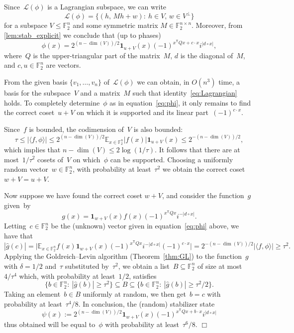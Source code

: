 \documentclass[11pt]{amsart}
\newcommand{\E}{\mathbb{E}}
\newcommand{\F}{\mathbb{F}} %
\newcommand{\Lcal}{\mathcal{L}}
\newcommand{\one}{\mathbf{1}}
\theoremstyle{plain}
\theoremstyle{definition}
\theoremstyle{remark}
\renewenvironment{proof}[1][]{
    	\begin{trivlist}
     	\item[\hspace{\labelsep}{\em\noindent Proof#1:\/}]}
     	{{\hfill$\Box$}
    	\end{trivlist}
  }
\begin{document}
\begin{proof}
Since~$\Lcal(\phi)$ is a Lagrangian subspace, we can write
\begin{equation} \label{eq:Lagrangian}
    \Lcal(\phi) = \big\{(h,\, Mh+w):\: h\in V,\, w\in V^{\perp}\big\}
\end{equation}
for a subspace $V\leq \F_2^n$ and some symmetric matrix $M\in \F_2^{n\times n}$.
Moreover, from \cref{lem:stab_explicit} we conclude that (up to phases)
\begin{equation} \label{eq:phi}
    \phi(x) = 2^{(n-\dim(V))/2} \one_{u+V}(x) (-1)^{x^{\mathsf T} Qx + c\cdot x} i^{|d\circ x|},
\end{equation}
where~$Q$ is the upper-triangular part of the matrix~$M$, $d$ is the diagonal of~$M$, and $c, u\in \F_2^n$ are vectors.

From the given basis $\{v_1, \dots, v_n\}$ of~$\Lcal(\phi)$ we can obtain, in $O(n^3)$ time, a basis for the subspace~$V$ and a matrix~$M$ such that identity~\eqref{eq:Lagrangian} holds.
To completely determine~$\phi$ as in equation~\eqref{eq:phi}, it only remains to find the correct coset~$u+V$ on which it is supported and its linear part~$(-1)^{c\cdot x}$.

Since~$f$ is bounded, the codimension of~$V$ is also bounded:
$$\tau \leq |\langle f, \phi\rangle| \leq 2^{(n-\dim(V))/2} \E_{x\in \F_2^n} |f(x)| \one_{u+V}(x) \leq 2^{-(n-\dim(V))/2},$$
which implies that $n-\dim(V) \leq 2\log(1/\tau)$.
It follows that there are at most~$1/\tau^2$ cosets of~$V$ on which~$\phi$ can be supported.
Choosing a uniformly random vector~$w\in \F_2^n$, with probability at least~$\tau^2$ we obtain the correct coset $w+V = u+V$.

Now suppose we have found the correct coset $w+V$, and consider the function~$g$ given~by
$$g(x) = \one_{w+V}(x) f(x)(-1)^{x^{\mathsf T} Qx} i^{-|d\circ x|}.$$
Letting~$c\in \F_2^n$ be the (unknown) vector given in equation~\eqref{eq:phi} above, we have that
$$|\widehat{g}(c)| = \big|\E_{x\in \F_2^n} f(x) \one_{w+V}(x) (-1)^{x^{\mathsf T} Qx} i^{-|d\circ x|} (-1)^{c\cdot x}\big| = 2^{-(n-\dim(V))/2} |\langle f, \phi\rangle| \geq \tau^2.$$
Applying the Goldreich--Levin algorithm (Theorem~\ref{thm:GL}) to the function~$g$ with $\delta = 1/2$ and~$\tau$ substituted by~$\tau^2$, we obtain a list~$B\subseteq \F_2^n$ of size at most~$4/\tau^4$ which, with probability at least~$1/2$, satisfies
$$\big\{b\in \F_2^n:\: |\widehat{g}(b)| \geq \tau^2\big\} \subseteq B \subseteq \big\{b\in \F_2^n:\: |\widehat{g}(b)| \geq \tau^2/2\big\}.$$
Taking an element~$b\in B$ uniformly at random, we then get~$b=c$ with probability at least~$\tau^4/8$. In conclusion, the (random) stabilizer state
$$\psi(x) := 2^{(n-\dim(V))/2} \one_{w+V}(x) (-1)^{x^{\mathsf T} Qx + b\cdot x} i^{|d\circ x|}$$
thus obtained will be equal to~$\phi$ with probability at least~$\tau^6/8$.
\end{proof}
\end{document}
